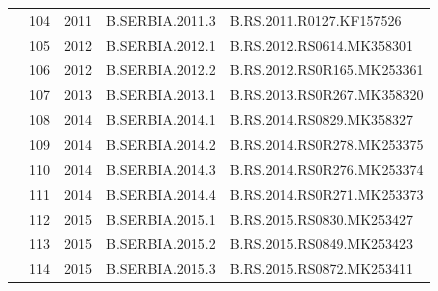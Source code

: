 \begin{table}[htbp]
\begin{tabular}{|cllll|}
\multicolumn{1}{|c|}{}                                  & \multicolumn{1}{l|}{104}         & \multicolumn{1}{l|}{2011}          & \multicolumn{1}{l|}{B.SERBIA.2011.3}    & B.RS.2011.R0127.KF157526        \\ \cline{2-5} 
\multicolumn{1}{|c|}{}                                  & \multicolumn{1}{l|}{105}         & \multicolumn{1}{l|}{2012}          & \multicolumn{1}{l|}{B.SERBIA.2012.1}    & B.RS.2012.RS0614.MK358301       \\ \cline{2-5} 
\multicolumn{1}{|c|}{}                                  & \multicolumn{1}{l|}{106}         & \multicolumn{1}{l|}{2012}          & \multicolumn{1}{l|}{B.SERBIA.2012.2}    & B.RS.2012.RS0R165.MK253361      \\ \cline{2-5} 
\multicolumn{1}{|c|}{}                                  & \multicolumn{1}{l|}{107}         & \multicolumn{1}{l|}{2013}          & \multicolumn{1}{l|}{B.SERBIA.2013.1}    & B.RS.2013.RS0R267.MK358320      \\ \cline{2-5} 
\multicolumn{1}{|c|}{}                                  & \multicolumn{1}{l|}{108}         & \multicolumn{1}{l|}{2014}          & \multicolumn{1}{l|}{B.SERBIA.2014.1}    & B.RS.2014.RS0829.MK358327       \\ \cline{2-5} 
\multicolumn{1}{|c|}{}                                  & \multicolumn{1}{l|}{109}         & \multicolumn{1}{l|}{2014}          & \multicolumn{1}{l|}{B.SERBIA.2014.2}    & B.RS.2014.RS0R278.MK253375      \\ \cline{2-5} 
\multicolumn{1}{|c|}{}                                  & \multicolumn{1}{l|}{110}         & \multicolumn{1}{l|}{2014}          & \multicolumn{1}{l|}{B.SERBIA.2014.3}    & B.RS.2014.RS0R276.MK253374      \\ \cline{2-5} 
\multicolumn{1}{|c|}{}                                  & \multicolumn{1}{l|}{111}         & \multicolumn{1}{l|}{2014}          & \multicolumn{1}{l|}{B.SERBIA.2014.4}    & B.RS.2014.RS0R271.MK253373      \\ \cline{2-5} 
\multicolumn{1}{|c|}{}                                  & \multicolumn{1}{l|}{112}         & \multicolumn{1}{l|}{2015}          & \multicolumn{1}{l|}{B.SERBIA.2015.1}    & B.RS.2015.RS0830.MK253427       \\ \cline{2-5} 
\multicolumn{1}{|c|}{}                                  & \multicolumn{1}{l|}{113}         & \multicolumn{1}{l|}{2015}          & \multicolumn{1}{l|}{B.SERBIA.2015.2}    & B.RS.2015.RS0849.MK253423       \\ \cline{2-5} 
\multicolumn{1}{|c|}{}                                  & \multicolumn{1}{l|}{114}         & \multicolumn{1}{l|}{2015}          & \multicolumn{1}{l|}{B.SERBIA.2015.3}    & B.RS.2015.RS0872.MK253411       \\ \hline
\end{tabular}
\end{table}


